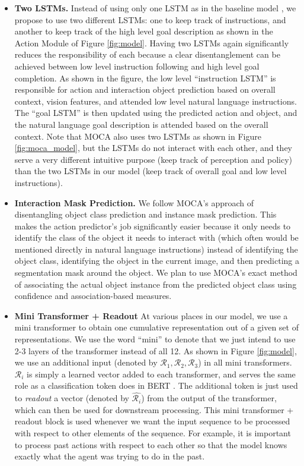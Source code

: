 \documentclass[11pt,a4paper]{article}
\begin{document}
\begin{itemize}
    \item \textbf{Two LSTMs.} Instead of using only one LSTM as in the baseline model \cite{shridhar2020alfred}, we propose to use two different LSTMs: one to keep track of instructions, and another to keep track of the high level goal description as shown in the Action Module of Figure \ref{fig:model}. Having two LSTMs again significantly reduces the responsibility of each because a clear disentanglement can be achieved between low level instruction following and high level goal completion. As shown in the figure, the low level ``instruction LSTM'' is responsible for action and interaction object prediction based on overall context, vision features, and attended low level natural language instructions. The ``goal LSTM'' is then updated using the predicted action and object, and the natural language goal description is attended based on the overall context. Note that MOCA also uses two LSTMs as shown in Figure \ref{fig:moca_model}, but the LSTMs do not interact with each other, and they serve a very different intuitive purpose (keep track of perception and policy) than the two LSTMs in our model (keep track of overall goal and low level instructions).

    \item \textbf{Interaction Mask Prediction.} We follow MOCA's \cite{singh2020moca} approach of disentangling object class prediction and instance mask prediction. This makes the action predictor's job significantly easier because it only needs to identify the class of the object it needs to interact with (which often would be mentioned directly in natural language instructions) instead of identifying the object class, identifying the object in the current image, and then predicting a segmentation mask around the object. We plan to use MOCA's exact method of associating the actual object instance from the predicted object class using confidence and association-based measures.

    \item \textbf{Mini Transformer + Readout} At various places in our model, we use a mini transformer to obtain one cumulative representation out of a given set of representations. We use the word ``mini'' to denote that we just intend to use 2-3 layers of the transformer instead of all 12.  As shown in Figure \ref{fig:model}, we use an additional input (denoted by $\mathcal{R}_1, \mathcal{R}_2, \mathcal{R}_3$) in all mini transformers. $\mathcal{R}_i$ is simply a learned vector added to each transformer, and serves the same role as a classification token does in BERT \cite{devlin2018bert}. The additional token is just used to \emph{readout} a vector (denoted by $\hat{\mathcal{R}_i}$) from the output of the transformer, which can then be used for downstream processing. This mini transformer + readout block is used whenever we want the input sequence to be processed with respect to other elements of the sequence. For example, it is important to process past actions with respect to each other so that the model knows exactly what the agent was trying to do in the past.

\end{itemize}
\end{document}
